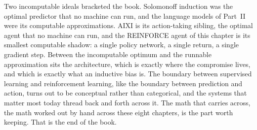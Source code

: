 Two incomputable ideals bracketed the book. Solomonoff induction was the
optimal predictor that no machine can run, and the language models of Part~II
were its computable approximations. AIXI is its action-taking sibling, the
optimal agent that no machine can run, and the REINFORCE agent of this chapter
is its smallest computable shadow: a single policy network, a single return, a
single gradient step. Between the incomputable optimum and the runnable
approximation sits the architecture, which is exactly where the compromise
lives, and which is exactly what an inductive bias is. The boundary between
supervised learning and reinforcement learning, like the boundary between
prediction and action, turns out to be conceptual rather than categorical, and
the systems that matter most today thread back and forth across it. The math
that carries across, the math worked out by hand across these eight chapters,
is the part worth keeping. That is the end of the book.
